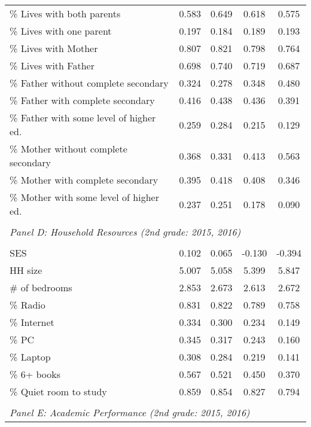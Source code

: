 {\begin{tabular}{lcccc}
\% Lives with both parents&       0.583&       0.649&       0.618&       0.575\\
\% Lives with one parent&       0.197&       0.184&       0.189&       0.193\\
\% Lives with Mother&       0.807&       0.821&       0.798&       0.764\\
\% Lives with Father&       0.698&       0.740&       0.719&       0.687\\
\% Father without complete secondary&       0.324&       0.278&       0.348&       0.480\\
\% Father with complete secondary&       0.416&       0.438&       0.436&       0.391\\
\% Father with some level of higher ed.&       0.259&       0.284&       0.215&       0.129\\
\% Mother without complete secondary&       0.368&       0.331&       0.413&       0.563\\
\% Mother with complete secondary&       0.395&       0.418&       0.408&       0.346\\
\% Mother with some level of higher ed.&       0.237&       0.251&       0.178&       0.090\\
&  &  &   \\
\multicolumn{4}{l}{\textit{Panel D: Household Resources (2nd grade: 2015, 2016)}} \\
            &            &            &            &            \\
SES         &       0.102&       0.065&      -0.130&      -0.394\\
HH size     &       5.007&       5.058&       5.399&       5.847\\
\# of bedrooms&       2.853&       2.673&       2.613&       2.672\\
\% Radio    &       0.831&       0.822&       0.789&       0.758\\
\% Internet &       0.334&       0.300&       0.234&       0.149\\
\% PC       &       0.345&       0.317&       0.243&       0.160\\
\% Laptop   &       0.308&       0.284&       0.219&       0.141\\
\% 6+ books &       0.567&       0.521&       0.450&       0.370\\
\% Quiet room to study&       0.859&       0.854&       0.827&       0.794\\
&  &  &   \\
\multicolumn{4}{l}{\textit{Panel E: Academic Performance (2nd grade: 2015, 2016)}} \\

\end{tabular}}
